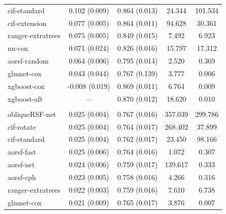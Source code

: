 \documentclass{article}\usepackage[]{graphicx}\usepackage[]{xcolor}
\newenvironment{knitrout}{}{} %
\begin{document}
\begin{knitrout}
\begin{longtable}[t]{lcccc}
\hspace{1em}cif-standard & 0.102 (0.009) & 0.864 (0.013) & 24.344 & 101.534\\
\hspace{1em}cif-extension & 0.077 (0.005) & 0.864 (0.011) & 94.628 & 30.361\\
\hspace{1em}ranger-extratrees & 0.075 (0.005) & 0.849 (0.015) & 7.492 & 6.923\\
\hspace{1em}nn-cox & 0.071 (0.024) & 0.826 (0.016) & 15.797 & 17.312\\
\hspace{1em}aorsf-random & 0.064 (0.006) & 0.795 (0.014) & 2.520 & 0.369\\
\hspace{1em}glmnet-cox & 0.043 (0.044) & 0.767 (0.139) & 3.777 & 0.006\\
\hspace{1em}xgboost-cox & -0.008 (0.019) & 0.869 (0.011) & 6.764 & 0.009\\
\hspace{1em}xgboost-aft & --- & 0.870 (0.012) & 18.620 & 0.010\\
\addlinespace[0.3em]
\multicolumn{5}{l}{\textit{\textbf{MESA; stroke, n = 6783, p = 48}}}\\
\hline
\hspace{1em}obliqueRSF-net & 0.025 (0.004) & 0.767 (0.016) & 357.039 & 299.786\\
\hspace{1em}cif-rotate & 0.025 (0.004) & 0.764 (0.017) & 268.402 & 37.899\\
\hspace{1em}cif-standard & 0.025 (0.004) & 0.762 (0.017) & 23.450 & 98.166\\
\hspace{1em}aorsf-fast & 0.025 (0.006) & 0.764 (0.016) & 1.072 & 0.307\\
\hspace{1em}aorsf-net & 0.024 (0.006) & 0.759 (0.017) & 139.617 & 0.333\\
\hspace{1em}aorsf-cph & 0.023 (0.005) & 0.758 (0.016) & 4.266 & 0.316\\
\hspace{1em}ranger-extratrees & 0.022 (0.003) & 0.759 (0.016) & 7.610 & 6.738\\
\hspace{1em}glmnet-cox & 0.021 (0.009) & 0.765 (0.017) & 3.876 & 0.007\\

\end{longtable}
\end{knitrout}
\end{document}
